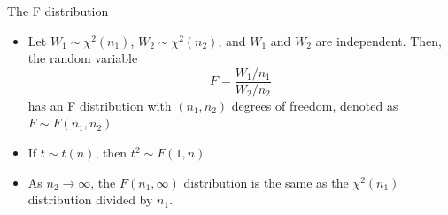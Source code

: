 \documentclass[presentation]{beamer}
\begin{document}
\begin{frame}[label={sec:orgc064db5}]{The F distribution}
\begin{itemize}
\item Let \(W_1 \sim \chi^2(n_1)\), \(W_2 \sim \chi^2(n_2)\), and \(W_1\) and
\(W_2\) are independent. Then, the random variable
\[ F = \frac{W_1/n_1}{W_2/n_2}\]
has an F distribution with \((n_1, n_2)\) degrees of freedom, denoted as
\(F \sim F(n_1, n_2)\)

\item If \(t \sim t(n)\), then \(t^2 \sim F(1, n)\)

\item As \(n_2 \rightarrow \infty\), the \(F(n_1, \infty)\) distribution is the
same as the \(\chi^2(n_1)\) distribution divided by \(n_1\).
\end{itemize}
\end{frame}
\end{document}
